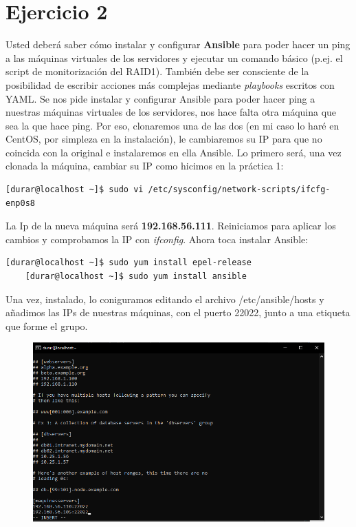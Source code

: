 \documentclass[a4paper]{article}
\begin{document}
\section{Ejercicio 2}
Usted deberá saber cómo instalar y configurar \textbf{Ansible} para poder hacer
un ping a las máquinas virtuales de los servidores y ejecutar un comando básico (p.ej. el
script de monitorización del RAID1). También debe ser consciente de la posibilidad de
escribir acciones más complejas mediante \textsl{playbooks} escritos con YAML.
\newline
Se nos pide instalar y configurar Ansible para poder hacer ping a nuestras máquinas virtuales de 
los servidores, nos hace falta otra máquina que sea la que hace ping. Por eso, clonaremos una de las dos
(en mi caso lo haré en CentOS, por simpleza en la instalación), le cambiaremos su IP para que no 
coincida con la original e instalaremos en ella Ansible. \newline
Lo primero será, una vez clonada la máquina, cambiar su IP como hicimos en la práctica 1:
\begin{lstlisting}[style=bashCentOS]
    [durar@localhost ~]$ sudo vi /etc/sysconfig/network-scripts/ifcfg-enp0s8
\end{lstlisting}
La Ip de la nueva máquina será \textbf{192.168.56.111}. Reiniciamos para aplicar los cambios y
comprobamos la IP con \textsl{ifconfig}.
Ahora toca instalar Ansible:
\begin{lstlisting}[style=bashCentOS]
    [durar@localhost ~]$ sudo yum install epel-release
    [durar@localhost ~]$ sudo yum install ansible
\end{lstlisting}
Una vez, instalado, lo coniguramos editando el archivo /etc/ansible/hosts y añadimos las IPs de nuestras
máquinas, con el puerto 22022, junto a una etiqueta que forme el grupo.
\newpage
\begin{figure}
    \centering
    \includegraphics[width=\textwidth]{cambiando conf de ansible1.png}
\end{figure}
\end{document}
